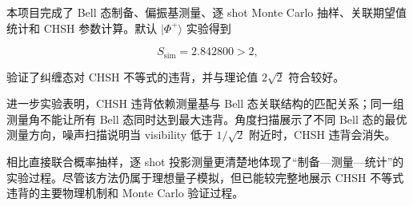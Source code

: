 \documentclass{zjureport}
\begin{document}
本项目完成了 Bell 态制备、偏振基测量、逐 shot Monte Carlo 抽样、关联期望值统计和 CHSH 参数计算。默认 \(|\Phi^+\rangle\) 实验得到

\[
S_{\mathrm{sim}}=2.842800>2,
\]

验证了纠缠态对 CHSH 不等式的违背，并与理论值 \(2\sqrt{2}\) 符合较好。

进一步实验表明，CHSH 违背依赖测量基与 Bell 态关联结构的匹配关系；同一组测量角不能让所有 Bell 态同时达到最大违背。角度扫描展示了不同 Bell 态的最优测量方向，噪声扫描说明当 visibility 低于 \(1/\sqrt{2}\) 附近时，CHSH 违背会消失。

相比直接联合概率抽样，逐 shot 投影测量更清楚地体现了``制备---测量---统计''的实验过程。尽管该方法仍属于理想量子模拟，但已能较完整地展示 CHSH 不等式违背的主要物理机制和 Monte Carlo 验证过程。

\clearpage
\end{document}
